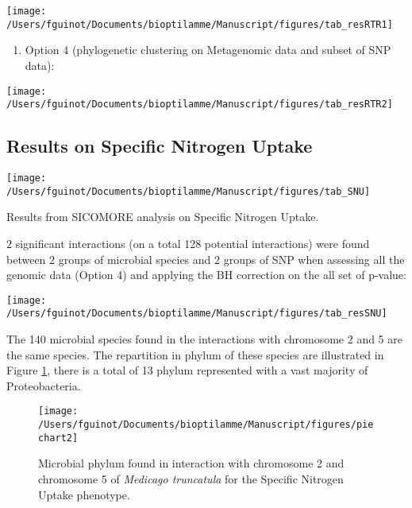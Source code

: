 \documentclass[]{book}
\providecommand{\tightlist}{%
  \setlength{\itemsep}{0pt}\setlength{\parskip}{0pt}}
\begin{document}
\begin{center}\texttt{[image: /Users/fguinot/Documents/bioptilamme/Manuscript/figures/tab\_resRTR1]} \end{center}

\begin{enumerate}
\def\labelenumi{\arabic{enumi}.}
\setcounter{enumi}{1}
\tightlist
\item
  Option 4 (phylogenetic clustering on Metagenomic data and subset of SNP data):
\end{enumerate}

\begin{center}\texttt{[image: /Users/fguinot/Documents/bioptilamme/Manuscript/figures/tab\_resRTR2]} \end{center}

\hypertarget{results-on-specific-nitrogen-uptake}{%
\subsection{Results on Specific Nitrogen Uptake}\label{results-on-specific-nitrogen-uptake}}

\begin{center}\texttt{[image: /Users/fguinot/Documents/bioptilamme/Manuscript/figures/tab\_SNU]} \end{center}

\label{tab:tabSNU}Results from SICOMORE analysis on Specific Nitrogen Uptake.

2 significant interactions (on a total 128 potential interactions) were
found between 2 groups of microbial species and 2 groups of SNP when
assessing all the genomic data (Option 4) and applying the BH correction
on the all set of p-value:

\begin{center}\texttt{[image: /Users/fguinot/Documents/bioptilamme/Manuscript/figures/tab\_resSNU]} \end{center}

The 140 microbial species found in the interactions with chromosome 2
and 5 are the same species. The repartition in phylum of these species
are illustrated in Figure \ref{fig:piechart2}, there is a total of 13
phylum represented with a vast majority of Proteobacteria.



\begin{figure}

{\centering \texttt{[image: /Users/fguinot/Documents/bioptilamme/Manuscript/figures/piechart2]} 

}

\caption{Microbial phylum found in interaction with chromosome 2 and chromosome 5 of \emph{Medicago truncatula} for the Specific Nitrogen Uptake phenotype.}\label{fig:piechart2}
\end{figure}
\end{document}
